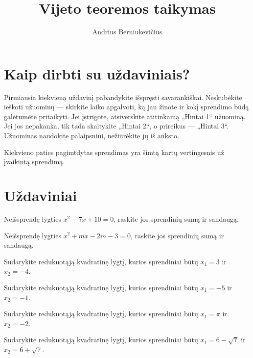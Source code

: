 \documentclass[11pt,a4paper]{scrartcl}
\title{Vijeto teoremos taikymas}
\author{Andrius Berniukevičius}
\begin{document}
\maketitle

\section*{Kaip dirbti su uždaviniais?}

Pirmiausia kiekvieną uždavinį pabandykite išspręsti savarankiškai. Neskubėkite ieškoti užuominų — skirkite laiko apgalvoti, ką jau žinote ir kokį sprendimo būdą galėtumėte pritaikyti. Jei įstrigote, atsiverskite atitinkamą „Hintai 1“ užuominą. Jei jos nepakanka, tik tada skaitykite „Hintai 2“, o prireikus — „Hintai 3“. Užuominas naudokite palaipsniui, nežiūrėkite jų iš anksto.

Kiekvieno paties pagimtdytas sprendimas yra šimtą kartų vertingesnis už įvaikintą sprendimą.

\section{Uždaviniai}

\begin{problem}
Neišsprendę lygties $x^2 - 7x + 10 = 0$, raskite jos sprendinių sumą ir sandaugą.
\end{problem}


\begin{problem}
Neišsprendę lygties $x^2 + mx -2m-3 = 0$, raskite jos sprendinių sumą ir sandaugą.
\end{problem}

\begin{problem}
Sudarykite redukuotąją kvadratinę lygtį, kurios sprendiniai būtų $x_1 = 3$ ir $x_2 = -4$.
\end{problem}

\begin{problem}
Sudarykite redukuotąją kvadratinę lygtį, kurios sprendiniai būtų $x_1 = -5$ ir $x_2 = -1$.
\end{problem}

\begin{problem}
Sudarykite redukuotąją kvadratinę lygtį, kurios sprendiniai būtų $x_1 = \pi $ ir $x_2 = -2$.
\end{problem}

\begin{problem}
Sudarykite redukuotąją kvadratinę lygtį, kurios sprendiniai būtų $x_1 = 6- \sqrt{7} $ ir $x_2 = 6+ \sqrt{7} $.
\end{problem}
\end{document}
